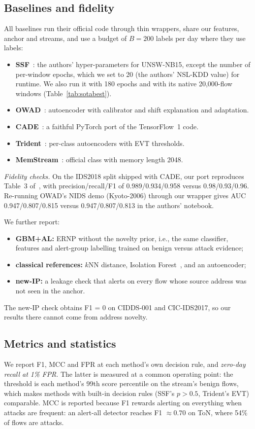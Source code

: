\documentclass[preprint,12pt]{elsarticle}
\begin{document}
\subsection{Baselines and fidelity}
All baselines run their official code through thin wrappers, share our features, anchor and streams, and use a budget of $B=200$ labels per day where they use labels:
\begin{itemize}
\item \textbf{SSF}~\cite{zhang2025ssf}: the authors' hyper-parameters for UNSW-NB15, except the number of per-window epochs, which we set to 20 (the authors' NSL-KDD value) for runtime. We also run it with 180 epochs and with its native 20,000-flow windows (Table~\ref{tab:sotabest}).
\item \textbf{OWAD}~\cite{han2023owad}: autoencoder with calibrator and shift explanation and adaptation.
\item \textbf{CADE}~\cite{yang2021cade}: a faithful PyTorch port of the TensorFlow~1 code.
\item \textbf{Trident}~\cite{zhao2024trident}: per-class autoencoders with EVT thresholds.
\item \textbf{MemStream}~\cite{bhatia2022memstream}: official class with memory length 2048.
\end{itemize}

\emph{Fidelity checks.} On the IDS2018 split shipped with CADE, our port reproduces Table~3 of~\cite{yang2021cade}, with precision/recall/F1 of 0.989/0.934/0.958 versus 0.98/0.93/0.96. Re-running OWAD's NIDS demo (Kyoto-2006) through our wrapper gives AUC 0.947/0.807/0.815 versus 0.947/0.807/0.813 in the authors' notebook.

We further report:
\begin{itemize}
\item \textbf{GBM+AL:} ERNP without the novelty prior, i.e., the same classifier, features and alert-group labelling trained on benign versus attack evidence;
\item \textbf{classical references:} $k$NN distance, Isolation Forest~\cite{liu2008iforest}, and an autoencoder;
\item \textbf{new-IP:} a leakage check that alerts on every flow whose source address was not seen in the anchor.
\end{itemize}
The new-IP check obtains F1 = 0 on CIDDS-001 and CIC-IDS2017, so our results there cannot come from address novelty.

\subsection{Metrics and statistics}
We report F1, MCC and FPR at each method's own decision rule, and \emph{zero-day recall at 1\% FPR}. The latter is measured at a common operating point: the threshold is each method's 99th score percentile on the stream's benign flows, which makes methods with built-in decision rules (SSF's $p>0.5$, Trident's EVT) comparable. MCC is reported because F1 rewards alerting on everything when attacks are frequent: an alert-all detector reaches F1 $\approx 0.70$ on ToN, where 54\% of flows are attacks.
\end{document}
